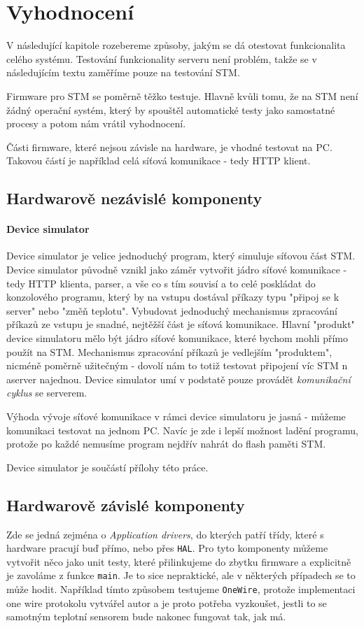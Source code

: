 
\section{Vyhodnocení}
V následující kapitole rozebereme způsoby, jakým se dá otestovat funkcionalita celého systému.
Testování funkcionality serveru není problém, takže se v následujícím textu zaměříme pouze na
testování STM.

Firmware pro STM se poměrně těžko testuje.
Hlavně kvůli tomu, že na STM není žádný operační systém, který by spouštěl automatické testy jako
samostatné procesy a potom nám vrátil vyhodnocení.


Části firmware, které nejsou závisle na hardware, je vhodné testovat na PC.
Takovou částí je například celá síťová komunikace - tedy HTTP klient.

\subsection{Hardwarově nezávislé komponenty}

\paragraph{Device simulator}
Device simulator je velice jednoduchý program, který simuluje síťovou část STM.
Device simulator původně vznikl jako záměr vytvořit jádro síťové komunikace - tedy HTTP klienta,
parser, a vše co s tím souvisí a to celé poskládat do konzolového programu, který by na vstupu
dostával příkazy typu "připoj se k server" nebo "změň teplotu".
Vybudovat jednoduchý mechanismus zpracování příkazů ze vstupu je snadné, nejtěžší část je síťová
komunikace.
Hlavní "produkt" device simulatoru mělo být jádro síťové komunikace, které bychom mohli přímo použít
na STM.
Mechanismus zpracování příkazů je vedlejším "produktem", nicméně poměrně užitečným - dovolí nám
to totiž testovat připojení víc STM n aserver najednou.
Device simulator umí v podstatě pouze provádět \emph{komunikační cyklus} se serverem.

Výhoda vývoje síťové komunikace v rámci device simulatoru je jasná - můžeme komunikaci testovat
na jednom PC.
Navíc je zde i lepší možnost ladění programu, protože po každé nemusíme program nejdřív nahrát
do flash paměti STM.

Device simulator je součástí přílohy této práce.

\subsection{Hardwarově závislé komponenty}
Zde se jedná zejména o \emph{Application drivers}, do kterých patří třídy, které s hardware pracují
buď přímo, nebo přes \texttt{HAL}.
Pro tyto komponenty můžeme vytvořit něco jako unit testy, které přilinkujeme do zbytku firmware a explicitně
je zavoláme z funkce \texttt{main}.
Je to sice nepraktické, ale v některých případech se to může hodit.
Například tímto způsobem testujeme \texttt{OneWire}, protože implementaci one wire protokolu vytvářel
autor a je proto potřeba vyzkoušet, jestli to se samotným teplotní sensorem bude nakonec fungovat tak, jak má.

